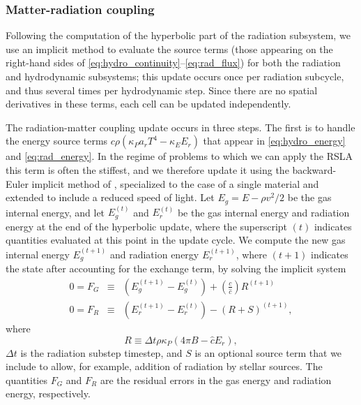 \documentclass[fleqn,usenatbib]{mnras}
\begin{document}
\subsubsection{Matter-radiation coupling}
\label{sssec:coupling}

Following the computation of the hyperbolic part of the radiation subsystem, we use an implicit method to evaluate the source terms (those appearing on the right-hand sides of \autoref{eq:hydro_continuity}--\autoref{eq:rad_flux}) for both the radiation and hydrodynamic subsystems; this update occurs once per radiation subcycle, and thus several times per hydrodynamic step. Since there are no spatial derivatives in these terms, each cell can be updated independently.

The radiation-matter coupling update occurs in three steps. The first is to handle the energy source terms $c\rho (\kappa_P a_r T^4 - \kappa_E E_r)$ that appear in \autoref{eq:hydro_energy} and \autoref{eq:rad_energy}. In the regime of problems to which we can apply the RSLA this term is often the stiffest, and we therefore update it using the backward-Euler implicit method of \cite{Howell_2003}, specialized to the case of a single material and extended to include a reduced speed of light. Let $E_g = E - \rho v^2/2$ be the gas internal energy, and let $E_g^{(t)}$ and $E_r^{(t)}$ be the gas internal energy and radiation energy at the end of the hyperbolic update, where the superscript $(t)$ indicates quantities evaluated at this point in the update cycle. We compute the new gas internal energy $E_g^{(t+1)}$ and radiation energy $E_r^{(t+1)}$, where $(t+1)$ indicates the state after accounting for the exchange term, by solving the implicit system
\begin{eqnarray}
0 = F_G &\equiv &\left(E_g^{(t+1)} - E_g^{(t)}\right) + \left( \frac{c}{\hat c} \right) R^{(t+1)} \\
0 = F_R &\equiv & \left(E_{r}^{(t+1)} - E_{r}^{(t)}\right) - \left( R + S \right)^{(t+1)},
\end{eqnarray}
where 
\begin{equation}
R \equiv \Delta t \rho \kappa_P (4 \pi B - \hat c E_r),
\end{equation}
$\Delta t$ is the radiation substep timestep, and $S$ is an optional source term that we include to allow, for example, addition of radiation by stellar sources. The quantities $F_G$ and $F_R$ are the residual errors in the gas energy and radiation energy, respectively.
\end{document}

